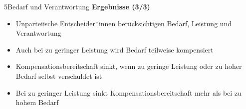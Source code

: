 \documentclass[xcolor=table,9pt,aspectratio=169]{beamer}
\begin{document}
\begin{frame}{\vspace*{10mm}5\hspace*{1em}Bedarf und Verantwortung}
\textbf{Ergebnisse (3/3)}\\
\medskip
\begin{itemize}
   \item Unparteiische Entscheider*innen berücksichtigen Bedarf, Leistung und Verantwortung
   \item Auch bei zu geringer Leistung wird Bedarf teilweise kompensiert
   \item Kompensationsbereitschaft sinkt, wenn zu geringe Leistung oder zu hoher Bedarf selbst verschuldet ist
   \item Bei zu geringer Leistung sinkt Kompensationsbereitschaft mehr als bei zu hohem Bedarf
\end{itemize}
\end{frame}
\end{document}

